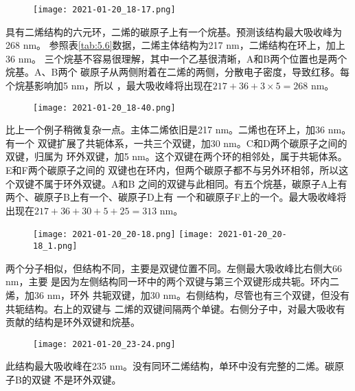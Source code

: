 \begin{example}
    \begin{figure}[htpb]
        \centering
        \texttt{[image: 2021-01-20\_18-17.png]}
        \label{fig:ex5.1}
    \end{figure}
具有二烯结构的六元环，二烯的碳原子上有一个烷基。预测该结构最大吸收峰为268 nm。
参照表\ref{tab:5.6}数据，二烯主体结构为217 nm，二烯结构在环上，加上36 nm。
三个烷基不容易很理解，其中一个乙基很清晰，A和B两个位置也是两个烷基。A、B两个
碳原子从两侧附着在二烯的两侧，分散电子密度，导致红移。每个烷基影响加5 nm，所以
，最大吸收峰将出现在$217 + 36 + 3\times 5 = 268$ nm。
\end{example}
\begin{example}
    \begin{figure}[htpb]
        \centering
        \texttt{[image: 2021-01-20\_18-40.png]}
        \label{fig:ex5.2}
    \end{figure}
比上一个例子稍微复杂一点。主体二烯依旧是217 nm。二烯也在环上，加36 nm。有一个
双键扩展了共轭体系，一共三个双键，加30 nm。C和D两个碳原子之间的双键，归属为
环外双键，加5 nm。这个双键在两个环的相邻处，属于共轭体系。E和F两个碳原子之间的
双键也在环内，但两个碳原子都不与另外环相邻，所以这个双键不属于环外双键。A和B
之间的双键与此相同。有五个烷基，碳原子A上有两个、碳原子B上有一个、碳原子D上有
一个和碳原子F上的一个。最大吸收峰将出现在$217+36+30+5+25=313$ nm。
\end{example}
\begin{example}
    \begin{figure}[htpb]
        \centering
        \texttt{[image: 2021-01-20\_20-18.png]}
        \texttt{[image: 2021-01-20\_20-18\_1.png]}
        \label{fig:ex5.3}
    \end{figure}
两个分子相似，但结构不同，主要是双键位置不同。左侧最大吸收峰比右侧大66 nm，主要
是因为左侧结构同一环中的两个双键与第三个双键形成共轭。环内二烯，加36 nm，环外
共轭双键，加30 nm。右侧结构，尽管也有三个双键，但没有共轭结构。右上的双键与
二烯的双键间隔两个单键。右侧分子中，对最大吸收有贡献的结构是环外双键和烷基。
\end{example}
\begin{example}
    \begin{figure}[htpb]
        \centering
        \texttt{[image: 2021-01-20\_23-24.png]}
        \label{fig:ex5.3}
    \end{figure}
此结构最大吸收峰在235 nm。没有同环二烯结构，单环中没有完整的二烯。碳原子B的双键
不是环外双键。
\end{example}
